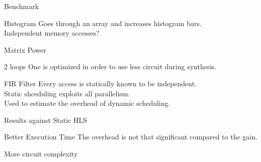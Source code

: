 \documentclass[page number]{beamer}
\begin{document}
\begin{frame}{Benchmark}
  \begin{block}{Histogram}
    Goes through an array and increases histogram bars.\\ Independent memory accesses?
  \end{block}
  \vfill
  \begin{block}{Matrix Power}
  \end{block}
  \vfill
  \begin{block}{2 loops}
    One is optimized in order to use less circuit during synthesis.
  \end{block}
  \vfill
  \begin{alertblock}{FIR Filter}
    Every access is statically known to be independent.\\
    Static shceduling exploits all parallelism.\\
    Used to estimate the overhead of dynamic scheduling.
  \end{alertblock}
\end{frame}

\begin{frame}{Results against Static HLS}
  \tiny
  \hspace*{-8pt}
  \vfill
  \normalsize
  \begin{exampleblock}{Better Execution Time}
    The overhead is not that significant compared to the gain.
  \end{exampleblock}
  \vfill
  \begin{alertblock}{More circuit complexity}
  \end{alertblock}
    
\end{frame}
\end{document}
